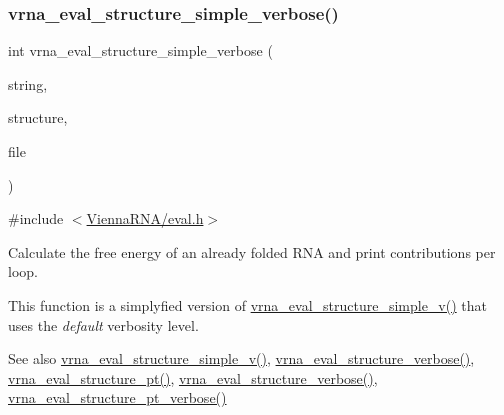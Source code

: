 \subsubsection{\texorpdfstring{vrna\+\_\+eval\+\_\+structure\+\_\+simple\+\_\+verbose()}{vrna\_eval\_structure\_simple\_verbose()}}
{\footnotesize\ttfamily int vrna\+\_\+eval\+\_\+structure\+\_\+simple\+\_\+verbose (\begin{DoxyParamCaption}\item[{const char $\ast$}]{string,  }\item[{const char $\ast$}]{structure,  }\item[{F\+I\+LE $\ast$}]{file }\end{DoxyParamCaption})}



{\ttfamily \#include $<$\hyperlink{eval_8h}{Vienna\+R\+N\+A/eval.\+h}$>$}



Calculate the free energy of an already folded R\+NA and print contributions per loop. 

This function is a simplyfied version of \hyperlink{group__eval_gacd6278343e77d13f1d53588e50d303bc}{vrna\+\_\+eval\+\_\+structure\+\_\+simple\+\_\+v()} that uses the {\itshape default} verbosity level.

\begin{DoxySeeAlso}{See also}
\hyperlink{group__eval_gacd6278343e77d13f1d53588e50d303bc}{vrna\+\_\+eval\+\_\+structure\+\_\+simple\+\_\+v()}, \hyperlink{group__eval_ga0928d699d310178f84ee2351034e5cb5}{vrna\+\_\+eval\+\_\+structure\+\_\+verbose()}, \hyperlink{group__eval_gadbd09372ddfd7a450bbd590c96a6bfe4}{vrna\+\_\+eval\+\_\+structure\+\_\+pt()}, \hyperlink{group__eval_ga0928d699d310178f84ee2351034e5cb5}{vrna\+\_\+eval\+\_\+structure\+\_\+verbose()}, \hyperlink{group__eval_ga8a517cfeeae8c376ae7b1e0c401d38b4}{vrna\+\_\+eval\+\_\+structure\+\_\+pt\+\_\+verbose()}
\end{DoxySeeAlso}

